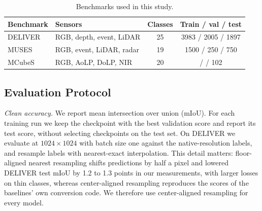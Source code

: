 \begin{table}[t]
\caption{Benchmarks used in this study.}
\label{tab:benchmarks}
\centering\tabsetup
\begin{tabular*}{\columnwidth}{@{\extracolsep{\fill}}llcc@{}}
\toprule
Benchmark & Sensors & Classes & Train / val / test \\
\midrule
DELIVER~\cite{cmnext2023} & RGB, depth, event, LiDAR & 25 & 3983 / 2005 / 1897 \\
MUSES~\cite{muses2024} & RGB, event, LiDAR, radar & 19 & 1500 / 250 / 750 \\
MCubeS~\cite{mcubes2022} & RGB, AoLP, DoLP, NIR & 20 & \td{} / \td{} / 102 \\
\bottomrule
\end{tabular*}
\end{table}

\subsection{Evaluation Protocol}
\emph{Clean accuracy.} We report mean intersection over union (mIoU). For each training run we keep the checkpoint with the best validation score and report its test score, without selecting checkpoints on the test set. On DELIVER we evaluate at $1024\times1024$ with batch size one against the native-resolution labels, and resample labels with nearest-exact interpolation. This detail matters: floor-aligned nearest resampling shifts predictions by half a pixel and lowered DELIVER test mIoU by 1.2 to 1.3 points in our measurements, with larger losses on thin classes, whereas center-aligned resampling reproduces the scores of the baselines' own conversion code. We therefore use center-aligned resampling for every model.

